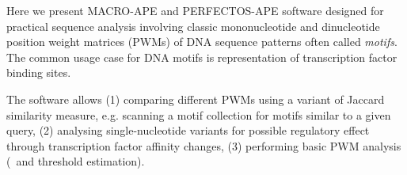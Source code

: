 Here we present MACRO-APE and PERFECTOS-APE software designed for practical sequence analysis involving classic mononucleotide and dinucleotide position weight matrices (PWMs) of DNA sequence patterns often called \textit{motifs}. The common usage case for DNA motifs is representation of transcription factor binding sites.

The software allows (1) comparing different PWMs using a variant of Jaccard similarity measure, e.g. scanning a motif collection for motifs similar to a given query, (2) analysing single-nucleotide variants for possible regulatory effect through transcription factor affinity changes, (3) performing basic PWM analysis (\pvalue\ and threshold estimation).
